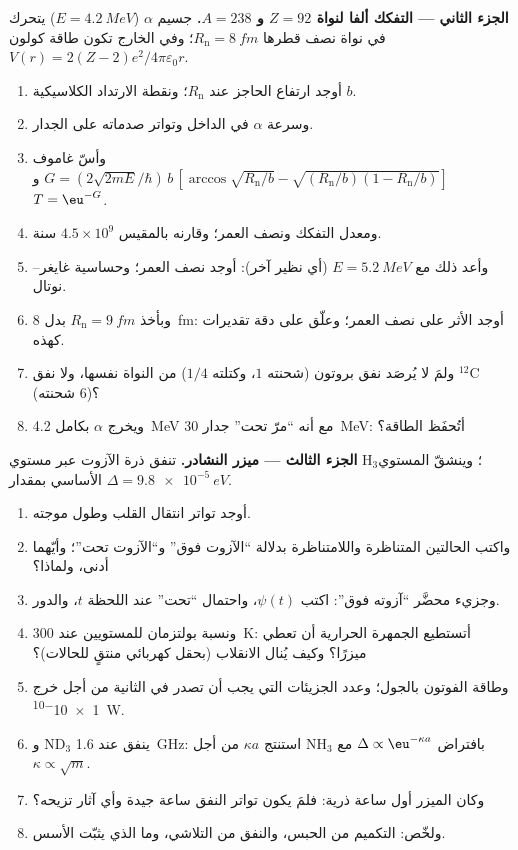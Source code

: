 \begin{problem}
\textbf{الجزء الثاني --- التفكك ألفا لنواة $Z = 92$ و $A = 238$.}
جسيم $\alpha$ ($E = \qty{4.2}{MeV}$) يتحرك في نواة نصف قطرها
$R_{\text{n}} = \qty{8}{fm}$؛ وفي الخارج تكون طاقة كولون $V(r) =
2(Z - 2)e^2/4\pi\varepsilon_0r$.
\begin{enumerate}[resume]
  \item أوجد ارتفاع الحاجز عند $R_{\text{n}}$؛ ونقطة الارتداد الكلاسيكية
        $b$.
  \item وسرعة $\alpha$ في الداخل وتواتر صدماته على
        الجدار.
  \item وأسّ غاموف $G = (2\sqrt{2mE}/\hbar)\,b\,[\arccos\sqrt{R_{\text{n}}/b}
        - \sqrt{(R_{\text{n}}/b)(1 - R_{\text{n}}/b)}]$ و $T = \eu^{-G}$.
  \item ومعدل التفكك ونصف العمر؛ وقارنه بالمقيس $4.5 \times
        10^9$ سنة.
  \item وأعد ذلك مع $E = \qty{5.2}{MeV}$ (أي نظير آخر): أوجد نصف العمر؛
        وحساسية غايغر--نوتال.
  \item وبأخذ $R_{\text{n}} = \qty{9}{fm}$ بدل \qty{8}{fm}: أوجد الأثر على
        نصف العمر؛ وعلّق على دقة تقديرات كهذه.
  \item ولمَ لا يُرصَد نفق بروتون (شحنته $1$، وكتلته $1/4$)
        من النواة نفسها، ولا نفق $^{12}$C (شحنته $6$)؟
  \item ويخرج $\alpha$ بكامل \qty{4.2}{MeV} مع أنه
        ``مرّ تحت'' جدار \qty{30}{MeV}: أتُحفَظ الطاقة؟
\end{enumerate}

\textbf{الجزء الثالث --- ميزر النشادر.}
تنفق ذرة الآزوت عبر مستوي H$_3$؛ وينشقّ المستوي الأساسي
بمقدار $\Delta = \qty{9.8e-5}{eV}$.
\begin{enumerate}[resume]
  \item أوجد تواتر انتقال القلب وطول موجته.
  \item واكتب الحالتين المتناظرة واللامتناظرة بدلالة
        ``الآزوت فوق'' و``الآزوت تحت''؛ وأيّهما أدنى، ولماذا؟
  \item وجزيء محضَّر ``آزوته فوق'': اكتب $\psi(t)$، واحتمال
        ``تحت'' عند اللحظة $t$، والدور.
  \item ونسبة بولتزمان للمستويين عند \qty{300}{K}: أتستطيع
        الجمهرة الحرارية أن تعطي ميزرًا؟ وكيف يُنال الانقلاب
        (بحقل كهربائي منتقٍ للحالات)؟
  \item وطاقة الفوتون بالجول؛ وعدد الجزيئات التي يجب أن تصدر
        في الثانية من أجل خرج \qty{1e-10}{W}.
  \item و ND$_3$ ينفق عند \qty{1.6}{GHz}: استنتج $\kappa a$ من أجل NH$_3$
        بافتراض $\Delta \propto \eu^{-\kappa a}$ مع $\kappa \propto \sqrt{m}$.
  \item وكان الميزر أول ساعة ذرية: فلمَ يكون تواتر
        النفق ساعة جيدة وأي آثار تزيحه؟
  \item ولخّص: التكميم من الحبس، والنفق من
        التلاشي، وما الذي يثبّت الأسس.
\end{enumerate}
\end{problem}
